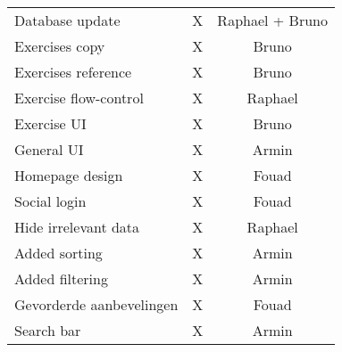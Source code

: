 \begin{tabular}{| l | c | c |}
    Database update         &   X   &   Raphael + Bruno \\
    Exercises copy          &   X   &   Bruno   \\
    Exercises reference     &   X   &   Bruno   \\
    Exercise flow-control   &   X   &   Raphael \\
    Exercise UI             &   X   &   Bruno   \\
    General UI              &   X   &   Armin   \\
    Homepage design         &   X   &   Fouad   \\
    Social login            &   X   &   Fouad   \\
    Hide irrelevant data    &   X   &   Raphael \\
    Added sorting           &   X   &   Armin   \\
    Added filtering         &   X   &   Armin   \\
    Gevorderde aanbevelingen    &   X   &   Fouad   \\
    Search bar              &   X   &   Armin   \\
    \hline
\end{tabular}
